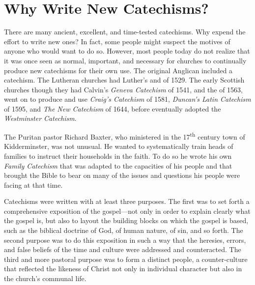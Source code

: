 \documentclass[]{memoir}
\begin{document}
\section{Why Write New Catechisms?}
There are many ancient, excellent, and time-tested catechisms. Why expend the effort to write new ones? In fact, some people might suspect the motives of anyone who would want to do so. However, most people today do not realize that it was once seen as normal, important, and necessary for churches to continually produce new catechisms for their own use. The original Anglican \/ included a catechism. The Lutheran churches had Luther's \/ and \/ of 1529. The early Scottish churches though they had Calvin's {\em Geneva Catechism}\/ of 1541, and the \/ of 1563, went on to produce and use \emph{Craig's Catechism}\/ of 1581, \emph{Duncan's Latin Catechism}\/ of 1595, and \emph{The New Catechism}\/ of 1644, before eventually adopted the \emph{Westminster Catechism}.

The Puritan pastor Richard Baxter, who ministered in the 17\textsuperscript{th} century town of Kidderminster, was not unusual. He wanted to systematically train heads of families to instruct their households in the faith. To do so he wrote his own \emph{Family Catechism}\/ that was adapted to the capacities of his people and that brought the Bible to bear on many of the issues and questions his people were facing at that time.

Catechisms were written with at least three purposes. The first was to set forth a comprehensive exposition of the gospel\thinspace{}---\thinspace{}not only in order to explain clearly what the gospel is, but also to layout the building blocks on which the gospel is based, such as the biblical doctrine of God, of human nature, of sin, and so forth. The second purpose was to do this exposition in such a way that the heresies, errors, and false beliefs of the time and culture were addressed and counteracted. The third and more pastoral purpose was to form a distinct people, a counter-culture that reflected the likeness of Christ not only in individual character but also in the church's communal life.
\end{document}
